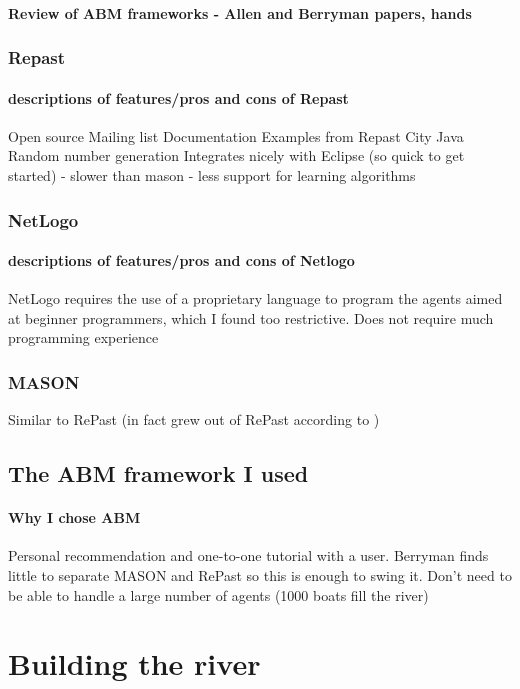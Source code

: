       \paragraph{Review of ABM frameworks - Allen and Berryman papers, hands}
      \subsubsection{Repast}
        \paragraph{descriptions of features/pros and cons of Repast}
        Open source
        Mailing list
        Documentation
        Examples from Repast City
        Java
        Random number generation
        Integrates nicely with Eclipse (so quick to get started)
        - slower than mason
        - less support for learning algorithms
      \subsubsection{NetLogo}
        \paragraph{descriptions of features/pros and cons of Netlogo}
        NetLogo requires the use of a proprietary
        language to program the agents aimed at beginner programmers, which I
        found too restrictive.
        Does not require much programming experience
        
      \subsubsection{MASON}
        Similar to RePast (in fact grew out of RePast according to )
    \subsection{The ABM framework I used}
      \paragraph{Why I chose ABM}
      Personal recommendation and one-to-one tutorial with a user. Berryman finds little to separate MASON and RePast so this is enough to swing it.
      Don't need to be able to handle a large number of agents (1000 boats fill the river)
  \section{Building the river}
